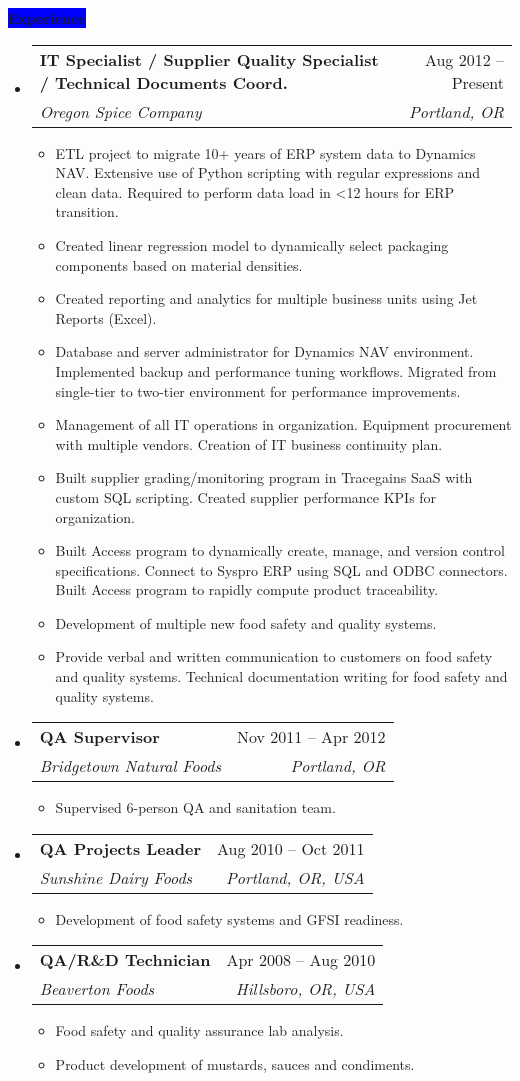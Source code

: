\documentclass[letterpaper,12pt]{article}[leftmargin=*]
\makeatletter
\def \entryspacing {-0pt}
\newcommand{\experience}[2]{\vspace{6pt}
  \colorbox{Blue}{\color{white}\raggedbottom\normalsize\textbf{{#1}{\hspace{9pt}#2\hspace{4pt}}}}
}
\newcommand{\resumeEntryStart}{\begin{itemize}[leftmargin=2.5mm]}
\newcommand{\resumeEntryEnd}{\end{itemize}\vspace{\entryspacing}}
\newcommand{\resumeItemListStart}{\begin{itemize}[leftmargin=4.5mm]}
\newcommand{\resumeItemListEnd}{\end{itemize}}
\newcommand{\resumeItem}[1]{
  \item\small{
    {#1 \vspace{-2pt}}
  }
}
\newcommand{\resumeEntryTSDL}[4]{
  \vspace{-1pt}\item[]
    \begin{tabularx}{0.97\textwidth}{X@{\hspace{60pt}}r}
      \textbf{\color{primary}#1} & {\firabook\color{accent}\small#2} \\
      \textit{\color{accent}\small#3} & \textit{\color{accent}\small#4} \\
    \end{tabularx}\vspace{-6pt}
}
\makeatother
\begin{document}
\experience{\faPieChart}{Experience}
 \resumeEntryStart
   \resumeEntryTSDL
      {IT Specialist / Supplier Quality Specialist / Technical Documents Coord.}{Aug 2012 -- Present}
      {Oregon Spice Company}{Portland, OR}
   \resumeItemListStart
    \resumeItem {ETL project to migrate 10+ years of ERP system data to Dynamics NAV. Extensive use of Python scripting with regular expressions and clean data. Required to perform data load in <12 hours for ERP transition.
}
    \resumeItem {Created linear regression model to dynamically select packaging components based on material densities.}
    \resumeItem {Created reporting and analytics for multiple business units using Jet Reports (Excel).}
    \resumeItem {Database and server administrator for Dynamics NAV environment. Implemented backup and performance tuning workflows. Migrated from single-tier to two-tier environment for performance improvements.}
    \resumeItem {Management of all IT operations in organization. Equipment procurement with multiple vendors. Creation of IT business continuity plan.}
    \resumeItem {Built supplier grading/monitoring program in Tracegains SaaS with custom SQL scripting. Created supplier performance KPIs for organization.}
    \resumeItem {Built Access program to dynamically create, manage, and version control specifications. Connect to Syspro ERP using SQL and ODBC connectors. Built Access program to rapidly compute product traceability.}
    \resumeItem {Development of multiple new food safety and quality systems.}
    \resumeItem {Provide verbal and written communication to customers on food safety and quality systems. Technical documentation writing for food safety and quality systems.}
  \resumeItemListEnd
 \resumeEntryEnd

  \resumeEntryStart
    \resumeEntryTSDL
      {QA Supervisor}{Nov 2011 -- Apr 2012}
      {Bridgetown Natural Foods}{Portland, OR}
    \resumeItemListStart
      \resumeItem {Supervised 6-person QA and sanitation team.}
    \resumeItemListEnd
  \resumeEntryEnd
  
\pagebreak 

   \resumeEntryStart
    \resumeEntryTSDL
      {QA Projects Leader}{Aug 2010 -- Oct 2011}
      {Sunshine Dairy Foods}{Portland, OR, USA}
    \resumeItemListStart
      \resumeItem {Development of food safety systems and GFSI readiness.}
    \resumeItemListEnd
  \resumeEntryEnd
  
  \resumeEntryStart
    \resumeEntryTSDL
      {QA/R\&D Technician}{Apr 2008 -- Aug 2010}
      {Beaverton Foods}{Hillsboro, OR, USA}
    \resumeItemListStart
      \resumeItem {Food safety and quality assurance lab analysis.}
      \resumeItem {Product development of mustards, sauces and condiments.}
    \resumeItemListEnd
  \resumeEntryEnd
  
\end{document}
